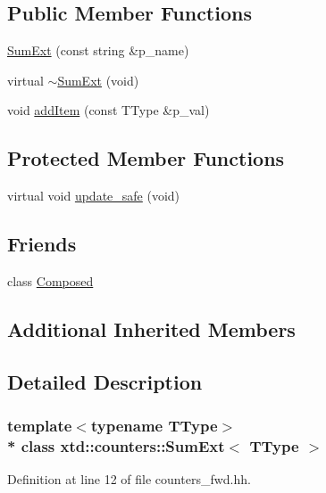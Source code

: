 \subsection*{Public Member Functions}
\begin{DoxyCompactItemize}
\item 
\hyperlink{classxtd_1_1counters_1_1SumExt_aeed4a5cca01073d91a3c24212618ab9e}{Sum\+Ext} (const string \&p\+\_\+name)
\item 
virtual \hyperlink{classxtd_1_1counters_1_1SumExt_a304ba48e158f8f75120b9449300c688a}{$\sim$\+Sum\+Ext} (void)
\item 
void \hyperlink{classxtd_1_1counters_1_1SumExt_a05b01643f8724ccdfd98f8a3209dc99c}{add\+Item} (const T\+Type \&p\+\_\+val)
\end{DoxyCompactItemize}
\subsection*{Protected Member Functions}
\begin{DoxyCompactItemize}
\item 
virtual void \hyperlink{classxtd_1_1counters_1_1SumExt_a1f3c5d348aa4b16104027fb2175acbe6}{update\+\_\+safe} (void)
\end{DoxyCompactItemize}
\subsection*{Friends}
\begin{DoxyCompactItemize}
\item 
class \hyperlink{classxtd_1_1counters_1_1SumExt_a93e934ad70d5b32b14beed5572450abf}{Composed}
\end{DoxyCompactItemize}
\subsection*{Additional Inherited Members}


\subsection{Detailed Description}
\subsubsection*{template$<$typename T\+Type$>$\\*
class xtd\+::counters\+::\+Sum\+Ext$<$ T\+Type $>$}



Definition at line 12 of file counters\+\_\+fwd.\+hh.



